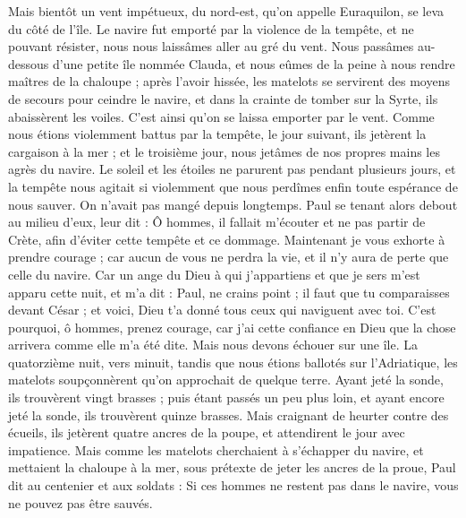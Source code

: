 \begin{multicols}{2}
{{{Mais bientôt un vent impétueux, du nord-est, qu'on appelle Euraquilon, se leva du côté de l'île.
Le navire fut emporté par la violence de la tempête, et ne pouvant résister, nous nous laissâmes aller au gré du vent.
Nous passâmes au-dessous d'une petite île nommée Clauda, et nous eûmes de la peine à nous rendre maîtres de la chaloupe ;
après l'avoir hissée, les matelots se servirent des moyens de secours pour ceindre le navire, et dans la crainte de tomber sur la Syrte, ils abaissèrent les voiles. C'est ainsi qu'on se laissa emporter par le vent.
Comme nous étions violemment battus par la tempête, le jour suivant, ils jetèrent la cargaison à la mer ;
et le troisième jour, nous jetâmes de nos propres mains les agrès du navire.
Le soleil et les étoiles ne parurent pas pendant plusieurs jours, et la tempête nous agitait si violemment que nous perdîmes enfin toute espérance de nous sauver.
On n'avait pas mangé depuis longtemps. Paul se tenant alors debout au milieu d'eux, leur dit : Ô hommes, il fallait m'écouter et ne pas partir de Crète, afin d'éviter cette tempête et ce dommage.
Maintenant je vous exhorte à prendre courage ; car aucun de vous ne perdra la vie, et il n'y aura de perte que celle du navire.
Car un ange du Dieu à qui j'appartiens et que je sers m'est apparu cette nuit,
et m'a dit : Paul, ne crains point ; il faut que tu comparaisses devant César ; et voici, Dieu t'a donné tous ceux qui naviguent avec toi.
C'est pourquoi, ô hommes, prenez courage, car j'ai cette confiance en Dieu que la chose arrivera comme elle m'a été dite.
Mais nous devons échouer sur une île.
La quatorzième nuit, vers minuit, tandis que nous étions ballotés sur l'Adriatique, les matelots soupçonnèrent qu'on approchait de quelque terre.
Ayant jeté la sonde, ils trouvèrent vingt brasses ; puis étant passés un peu plus loin, et ayant encore jeté la sonde, ils trouvèrent quinze brasses.
Mais craignant de heurter contre des écueils, ils jetèrent quatre ancres de la poupe, et attendirent le jour avec impatience.
Mais comme les matelots cherchaient à s'échapper du navire, et mettaient la chaloupe à la mer, sous prétexte de jeter les ancres de la proue,
Paul dit au centenier et aux soldats : Si ces hommes ne restent pas dans le navire, vous ne pouvez pas être sauvés.
}}}
\end{multicols}
